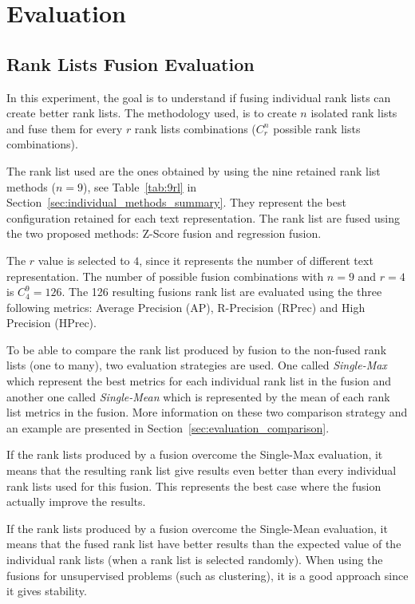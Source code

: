 \section{Evaluation}

\subsection{Rank Lists Fusion Evaluation \label{sec:eval_fusion}}

In this experiment, the goal is to understand if fusing individual rank lists can create better rank lists.
The methodology used, is to create $n$ isolated rank lists and fuse them for every $r$ rank lists combinations ($C^n_r$ possible rank lists combinations).

The rank list used are the ones obtained by using the nine retained rank list methods ($n=9$), see Table~\ref{tab:9rl} in Section~\ref{sec:individual_methods_summary}.
They represent the best configuration retained for each text representation.
The rank list are fused using the two proposed methods: Z-Score fusion and regression fusion.

The $r$ value is selected to $4$, since it represents the number of different text representation.
The number of possible fusion combinations with $n=9$ and $r=4$ is $C^{9}_{4} = 126$.
The 126 resulting fusions rank list are evaluated using the three following metrics: Average Precision (AP), R-Precision (RPrec) and High Precision (HPrec).

To be able to compare the rank list produced by fusion to the non-fused rank lists (one to many), two evaluation strategies are used.
One called \textit{Single-Max} which represent the best metrics for each individual rank list in the fusion and another one called \textit{Single-Mean} which is represented by the mean of each rank list metrics in the fusion.
More information on these two comparison strategy and an example are presented in Section~\ref{sec:evaluation_comparison}.

If the rank lists produced by a fusion overcome the Single-Max evaluation, it means that the resulting rank list give results even better than every individual rank lists used for this fusion.
This represents the best case where the fusion actually improve the results.

If the rank lists produced by a fusion overcome the Single-Mean evaluation, it means that the fused rank list have better results than the expected value of the individual rank lists (when a rank list is selected randomly).
When using the fusions for unsupervised problems (such as clustering), it is a good approach since it gives stability.

